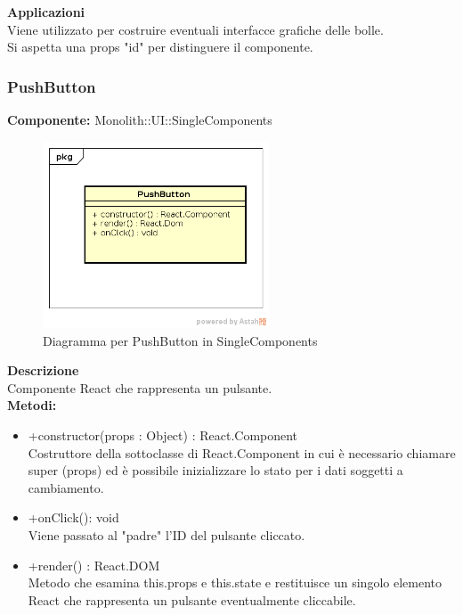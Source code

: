 \textbf{Applicazioni}\\
Viene utilizzato per costruire eventuali interfacce grafiche delle bolle. \\
Si aspetta una props "id" per distinguere il componente. 


\clearpage

\subsubsection{PushButton}
\textbf{Componente:}  Monolith::UI::SingleComponents\\
   \FloatBarrier
   \begin{figure}[ht]
   \centering
   \includegraphics[width=0.6\textwidth]{img/single-PushButton.png}
   \caption{{Diagramma per PushButton in SingleComponents}}
\end{figure}
\FloatBarrier
\textbf{Descrizione}\\
Componente React che rappresenta un pulsante. \\
\textbf{Metodi:} 
\begin{itemize}
\item +constructor(props : Object) : React.Component 
\\
Costruttore della sottoclasse di React.Component in cui è necessario chiamare super (props) ed è possibile inizializzare lo stato per i dati soggetti a cambiamento.

\item +onClick(): void 
\\ 
Viene passato al "padre" l'ID del pulsante cliccato.

\item +render() : React.DOM 
\\
Metodo che esamina this.props e this.state e restituisce un singolo elemento React che rappresenta un pulsante eventualmente cliccabile.

\end{itemize}

